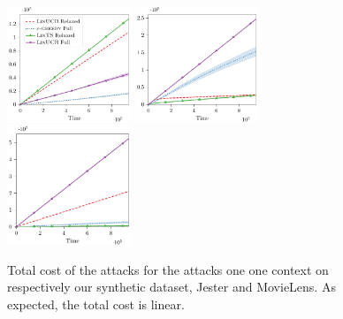 \begin{figure}[ht]
    \centering
    \includegraphics[width=0.33\textwidth]{sections/appendix/nips2020-bandits/images/one_context/simulations/standalone.pdf}\hfill
    \includegraphics[width=0.33\textwidth]{sections/appendix/nips2020-bandits/images/one_context/jester/standalone.pdf}\hfill
    \includegraphics[width=0.33\textwidth]{sections/appendix/nips2020-bandits/images/one_context/movielens/standalone.pdf}
    \caption{Total cost of the attacks for the attacks one one context on respectively our synthetic dataset, Jester and MovieLens. As expected, the total cost is linear.     \label{fig:cost_attack_one_ctx}}
\end{figure}
